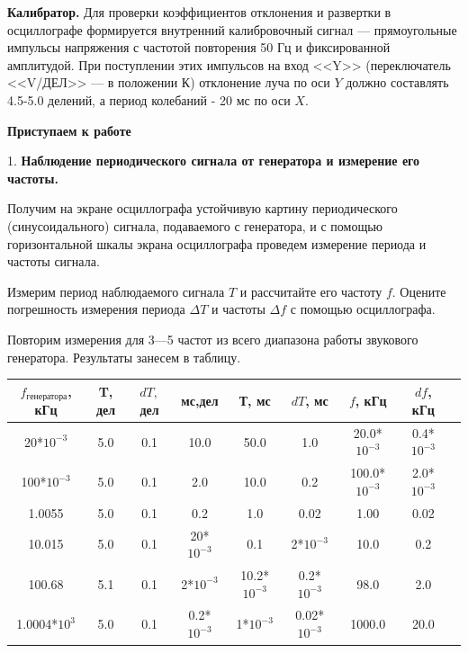 \documentclass[14pt]{article}
\begin{document}
%
%

\vspace{0.5cm}
\textbf{Калибратор.} Для проверки коэффициентов отклонения и развертки в осциллографе формируется внутренний калибровочный сигнал --- прямоугольные импульсы напряжения с частотой повторения 50 Гц и фиксированной амплитудой. При поступлении этих импульсов на вход <<Y>> (переключатель <<V/ДЕЛ>> --- в положении К) отклонение луча по оси $Y$ должно составлять 4.5-5.0 делений, а период колебаний - 20 мс по оси $X$.

%
%

\vspace{1cm}
\textbf{Приступаем к работе}

\vspace{0.5cm}
1. \textbf{Наблюдение периодического сигнала от генератора и измерение его частоты.} 

Получим на экране осциллографа устойчивую картину периодического (синусоидального) сигнала, подаваемого с генератора, и с помощью горизонтальной шкалы экрана осциллографа проведем измерение периода и частоты сигнала.

Измерим период наблюдаемого сигнала $T$ и рассчитайте его частоту $f$. Оцените погрешность измерения периода $\Delta T$ и частоты $\Delta f$ с помощью осциллографа.

Повторим измерения для 3—5 частот из всего диапазона работы звукового генератора. Результаты занесем в таблицу.

%
%

\begin{center}
\begin{tabular}{|c|c|c|c|c|c|c|c|c|}
\hline
$f_\text{генератора}$, кГц	&T, дел	&  $dT,$ дел&	мс,дел			&	Т, мс			&	$dT$, мс	&	$f$, кГц		&	$df$, кГц\\
\hline
20*$10^{-3}$				&5.0	&	0.1		&	10.0			&	50.0			&	1.0			&	20.0*$10^{-3}$	&	0.4*$10^{-3}$\\
\hline
100*$10^{-3}$				&5.0	&	0.1		&	2.0				&	10.0			&	0.2			&	100.0*$10^{-3}$	&	2.0*$10^{-3}$\\
\hline
1.0055						&5.0	&	0.1		&	0.2				&	1.0				&	0.02		&	1.00			&	0.02\\
\hline
10.015						&5.0	&	0.1		&	20*$10^{-3}$	&	0.1				&	2*$10^{-3}$	&	10.0			&	0.2\\	
\hline	
100.68						&5.1	&	0.1		&	2*$10^{-3}$		&	10.2*$10^{-3}$	&	0.2*$10^{-3}$&	98.0			&	2.0\\
\hline
1.0004*$10^3$				&5.0	&	0.1		&	0.2*$10^{-3}$	&	1*$10^{-3}$		&	0.02*$10^{-3}$&	1000.0			&	20.0\\
\hline
\end{tabular}
\end{center}
\end{document}
